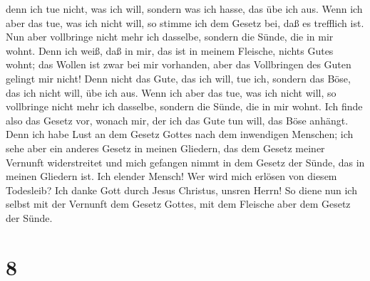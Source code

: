 denn ich tue nicht, was ich will, sondern was ich hasse, das übe ich
aus.  Wenn ich aber das tue, was ich nicht will, so
stimme ich dem Gesetz bei, daß es trefflich ist.  Nun
aber vollbringe nicht mehr ich dasselbe, sondern die Sünde, die in mir
wohnt.  Denn ich weiß, daß in mir, das ist in meinem
Fleische, nichts Gutes wohnt; das Wollen ist zwar bei mir vorhanden,
aber das Vollbringen des Guten gelingt mir nicht!  Denn
nicht das Gute, das ich will, tue ich, sondern das Böse, das ich nicht
will, übe ich aus.  Wenn ich aber das tue, was ich nicht
will, so vollbringe nicht mehr ich dasselbe, sondern die Sünde, die in
mir wohnt.  Ich finde also das Gesetz vor, wonach mir,
der ich das Gute tun will, das Böse anhängt.  Denn ich
habe Lust an dem Gesetz Gottes nach dem inwendigen Menschen;
 ich sehe aber ein anderes Gesetz in meinen Gliedern, das
dem Gesetz meiner Vernunft widerstreitet und mich gefangen nimmt in dem
Gesetz der Sünde, das in meinen Gliedern ist.  Ich
elender Mensch! Wer wird mich erlösen von diesem Todesleib?
 Ich danke Gott durch Jesus Christus, unsren Herrn! So
diene nun ich selbst mit der Vernunft dem Gesetz Gottes, mit dem
Fleische aber dem Gesetz der Sünde.

\hypertarget{section-7}{%
\section{8}\label{section-7}}

